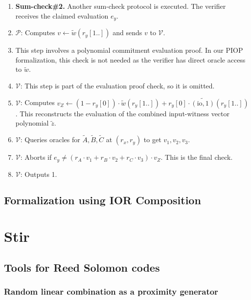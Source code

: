 \begin{description}
\begin{enumerate}
        \item \textbf{Sum-check\#2.} Another sum-check protocol is executed. The verifier receives the claimed evaluation $e_y$.
        \item $\mathcal{P}$: Computes $v \leftarrow \tilde{w}(r_y[1..])$ and sends $v$ to $\mathcal{V}$.
        \item This step involves a polynomial commitment evaluation proof. In our PIOP formalization, this check is not needed as the verifier has direct oracle access to $\tilde{w}$.
        \item $\mathcal{V}$: This step is part of the evaluation proof check, so it is omitted.
        \item $\mathcal{V}$: Computes $v_Z \leftarrow (1 - r_y[0]) \cdot \tilde{w}(r_y[1..]) + r_y[0] \cdot \widetilde{(\text{io}, 1)}(r_y[1..])$. This reconstructs the evaluation of the combined input-witness vector polynomial $\tilde{z}$.
        \item $\mathcal{V}$: Queries oracles for $\tilde{A}, \tilde{B}, \tilde{C}$ at $(r_x, r_y)$ to get $v_1, v_2, v_3$.
        \item $\mathcal{V}$: Aborts if $e_y \neq (r_A \cdot v_1 + r_B \cdot v_2 + r_C \cdot v_3) \cdot v_Z$. This is the final check.
        \item $\mathcal{V}$: Outputs 1.
    \end{enumerate}
\end{description}

\subsection{Formalization using IOR Composition}



\section{Stir}

\subsection{Tools for Reed Solomon codes}
\subsubsection{Random linear combination as a proximity generator}\label{sec:proximity_gap}

